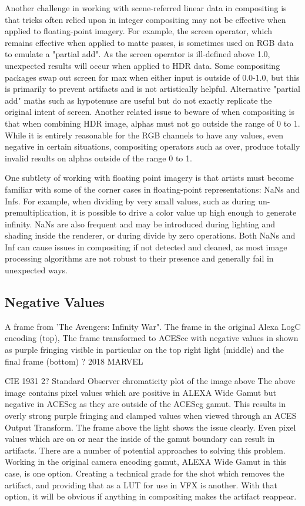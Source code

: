 Another challenge in working with scene-referred linear data in compositing is that tricks often relied upon in integer compositing may not be effective when applied to floating-point imagery. For example, the screen operator, which remains effective when applied to matte passes, is sometimes used on RGB data to emulate a "partial add". As the screen operator is ill-defined above 1.0, unexpected results will occur when applied to HDR data. Some compositing packages swap out screen for max when either input is outside of 0.0-1.0, but this is primarily to prevent artifacts and is not artistically helpful.  Alternative "partial add" maths such as hypotenuse are useful but do not exactly replicate the original intent of screen. Another related issue to beware of when compositing is that when combining HDR image, alphas must not go outside the range of 0 to 1. While it is entirely reasonable for the RGB channels to have any values, even negative in certain situations, compositing operators such as over, produce totally invalid results on alphas outside of the range 0 to 1.

One subtlety of working with floating point imagery is that artists must become familiar with some of the corner cases in floating-point representations: NaNs and Infs. For example, when dividing by very small values, such as during un-premultiplication, it is possible to drive a color value up high enough to generate infinity. NaNs are also frequent and may be introduced during lighting and shading inside the renderer, or during divide by zero operations. Both NaNs and Inf can cause issues in compositing if not detected and cleaned, as most image processing algorithms are not robust to their presence and generally fail in unexpected ways.

\subsection{Negative Values}%
\label{subsec:negative-values}



A frame from 'The Avengers: Infinity War". The frame in the original Alexa LogC encoding (top), The frame transformed to ACEScc with negative values in shown as purple fringing visible in particular on the top right light (middle) and the final frame (bottom)
? 2018 MARVEL


CIE 1931 2? Standard Observer chromaticity plot of the image above
The above image contains pixel values which are positive in ALEXA Wide Gamut but negative in ACEScg as they are outside of the ACEScg gamut. This results in overly strong purple fringing and clamped values when viewed through an ACES Output Transform. The frame above the light shows the issue clearly. Even pixel values which are on or near the inside of the gamut boundary can result in artifacts. There are a number of potential approaches to solving this problem. Working in the original camera encoding gamut, ALEXA Wide Gamut in this case, is one option. Creating a technical grade for the shot which removes the artifact, and providing that as a LUT for use in VFX is another. With that option, it will be obvious if anything in compositing makes the artifact reappear.




